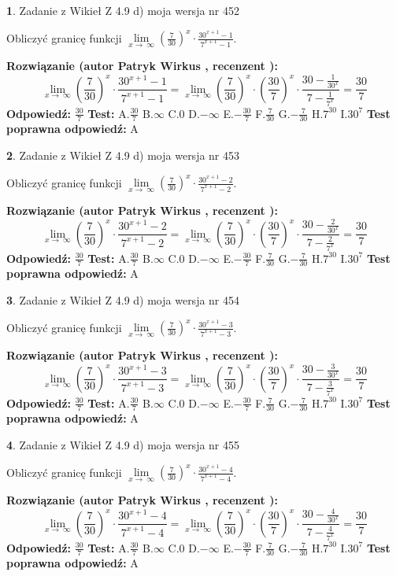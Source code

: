 \documentclass[12pt, a4paper]{article}
\theoremstyle{definition} %
\newtheorem{zad}{}
\newcommand{\zadStart}[1]{\begin{zad}#1\newline}
\newcommand{\zadStop}{\end{zad}}
\newcommand{\rozwStart}[2]{\noindent \textbf{Rozwiązanie (autor #1 , recenzent #2): }\newline}
\newcommand{\rozwStop}{\newline}
\newcommand{\odpStart}{\noindent \textbf{Odpowiedź:}\newline}
\newcommand{\odpStop}{\newline}
\newcommand{\testStart}{\noindent \textbf{Test:}\newline}
\newcommand{\testStop}{\newline}
\newcommand{\kluczStart}{\noindent \textbf{Test poprawna odpowiedź:}\newline}
\newcommand{\kluczStop}{\newline}
\begin{document}
\zadStart{Zadanie z Wikieł Z 4.9 d) moja wersja nr 452}


Obliczyć granicę funkcji  $\lim\limits_{x\to\ \infty}(\frac{7}{30})^{x}\cdot\frac{30^{x+1}-1}{7^{x+1}-1}$.
\zadStop
\rozwStart{Patryk Wirkus}{}
$$\lim\limits_{x\to\ \infty}(\frac{7}{30})^{x}\cdot\frac{30^{x+1}-1}{7^{x+1}-1}=\lim\limits_{x\to\ \infty}(\frac{7}{30})^{x}\cdot(\frac{30}{7})^{x} \cdot \frac{30-\frac{1}{30^{x}}}{7-\frac{1}{7^{x}}} = \frac{30}{7}$$
\rozwStop
\odpStart
$\frac{30}{7}$
\odpStop
\testStart
A.$\frac{30}{7}$ B.$\infty$ C.$0$ D.$-\infty$ E.$-\frac{30}{7}$
F.$\frac{7}{30}$ G.$-\frac{7}{30}$
H.$7^{30}$
I.$30^{7}$
\testStop
\kluczStart
A
\kluczStop



\zadStart{Zadanie z Wikieł Z 4.9 d) moja wersja nr 453}


Obliczyć granicę funkcji  $\lim\limits_{x\to\ \infty}(\frac{7}{30})^{x}\cdot\frac{30^{x+1}-2}{7^{x+1}-2}$.
\zadStop
\rozwStart{Patryk Wirkus}{}
$$\lim\limits_{x\to\ \infty}(\frac{7}{30})^{x}\cdot\frac{30^{x+1}-2}{7^{x+1}-2}=\lim\limits_{x\to\ \infty}(\frac{7}{30})^{x}\cdot(\frac{30}{7})^{x} \cdot \frac{30-\frac{2}{30^{x}}}{7-\frac{2}{7^{x}}} = \frac{30}{7}$$
\rozwStop
\odpStart
$\frac{30}{7}$
\odpStop
\testStart
A.$\frac{30}{7}$ B.$\infty$ C.$0$ D.$-\infty$ E.$-\frac{30}{7}$
F.$\frac{7}{30}$ G.$-\frac{7}{30}$
H.$7^{30}$
I.$30^{7}$
\testStop
\kluczStart
A
\kluczStop



\zadStart{Zadanie z Wikieł Z 4.9 d) moja wersja nr 454}


Obliczyć granicę funkcji  $\lim\limits_{x\to\ \infty}(\frac{7}{30})^{x}\cdot\frac{30^{x+1}-3}{7^{x+1}-3}$.
\zadStop
\rozwStart{Patryk Wirkus}{}
$$\lim\limits_{x\to\ \infty}(\frac{7}{30})^{x}\cdot\frac{30^{x+1}-3}{7^{x+1}-3}=\lim\limits_{x\to\ \infty}(\frac{7}{30})^{x}\cdot(\frac{30}{7})^{x} \cdot \frac{30-\frac{3}{30^{x}}}{7-\frac{3}{7^{x}}} = \frac{30}{7}$$
\rozwStop
\odpStart
$\frac{30}{7}$
\odpStop
\testStart
A.$\frac{30}{7}$ B.$\infty$ C.$0$ D.$-\infty$ E.$-\frac{30}{7}$
F.$\frac{7}{30}$ G.$-\frac{7}{30}$
H.$7^{30}$
I.$30^{7}$
\testStop
\kluczStart
A
\kluczStop



\zadStart{Zadanie z Wikieł Z 4.9 d) moja wersja nr 455}


Obliczyć granicę funkcji  $\lim\limits_{x\to\ \infty}(\frac{7}{30})^{x}\cdot\frac{30^{x+1}-4}{7^{x+1}-4}$.
\zadStop
\rozwStart{Patryk Wirkus}{}
$$\lim\limits_{x\to\ \infty}(\frac{7}{30})^{x}\cdot\frac{30^{x+1}-4}{7^{x+1}-4}=\lim\limits_{x\to\ \infty}(\frac{7}{30})^{x}\cdot(\frac{30}{7})^{x} \cdot \frac{30-\frac{4}{30^{x}}}{7-\frac{4}{7^{x}}} = \frac{30}{7}$$
\rozwStop
\odpStart
$\frac{30}{7}$
\odpStop
\testStart
A.$\frac{30}{7}$ B.$\infty$ C.$0$ D.$-\infty$ E.$-\frac{30}{7}$
F.$\frac{7}{30}$ G.$-\frac{7}{30}$
H.$7^{30}$
I.$30^{7}$
\testStop
\kluczStart
A
\kluczStop
\end{document}
